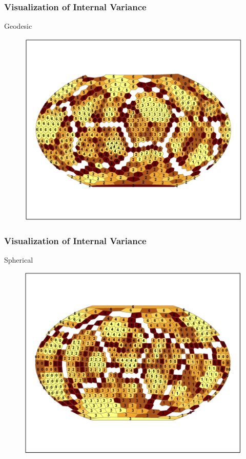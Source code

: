 \documentclass[nototal,handout]{beamer}
\begin{document}
\begin{frame}
	\frametitle{Visualization of Internal Variance}
 
\begin{block}{Geodesic}
  \begin{center}
  \begin{figure}
  \includegraphics[width=0.70\linewidth]{geodesic_clusters.png}
  \end{figure}
  \end{center}
 \end{block} \end{frame} 

\begin{frame}
	\frametitle{Visualization of Internal Variance}
 
\begin{block}{Spherical}
  \begin{center}
  \begin{figure}
  \includegraphics[width=0.70\linewidth]{sphere_clusters.png}
  \end{figure}
  \end{center}
 \end{block} \end{frame} 
\end{document}
